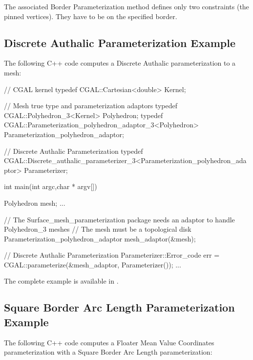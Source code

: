 The associated Border Parameterization method defines only two constraints
(the pinned vertices). They have to be on the specified border.


\subsection{Discrete Authalic Parameterization Example}

The following C++ code computes a Discrete Authalic parameterization
to a  mesh:

\begin{ccExampleCode}

// CGAL kernel
typedef CGAL::Cartesian<double>                         Kernel;

// Mesh true type and parameterization adaptors
typedef CGAL::Polyhedron_3<Kernel>                      Polyhedron;
typedef CGAL::Parameterization_polyhedron_adaptor_3<Polyhedron>
                                                        Parameterization_polyhedron_adaptor;

// Discrete Authalic Parameterization
typedef CGAL::Discrete_authalic_parameterizer_3<Parameterization_polyhedron_adaptor>
                                                        Parameterizer;

int main(int argc,char * argv[])
{
    Polyhedron mesh;
    ...

    // The Surface_mesh_parameterization package needs an adaptor to handle Polyhedron_3 meshes
    // The mesh must be a topological disk
    Parameterization_polyhedron_adaptor mesh_adaptor(&mesh);

    // Discrete Authalic Parameterization
    Parameterizer::Error_code err = CGAL::parameterize(&mesh_adaptor, Parameterizer());
    ...
}

\end{ccExampleCode}

The complete example is available in
.


\subsection{Square Border Arc Length Parameterization Example}

The following C++ code computes a Floater Mean Value Coordinates
parameterization with a Square Border Arc Length parameterization:

